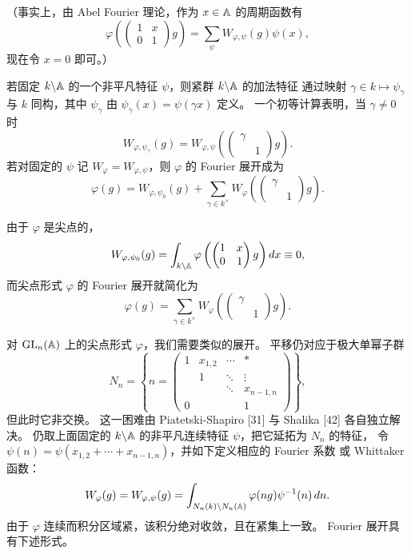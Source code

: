 （事实上，由 Abel Fourier 理论，作为 $x\in\mathbb{A}$ 的周期函数有
\[
\varphi\left(\begin{pmatrix}1&x\\0&1\end{pmatrix}g\right)=\sum_{\psi}W_{\varphi,\psi}(g)\psi(x),
\]
现在令 $x=0$ 即可。）

若固定 $k\backslash\mathbb{A}$ 的一个非平凡特征 $\psi$，则紧群 $k\backslash\mathbb{A}$ 的加法特征
通过映射 $\gamma\in k\mapsto\psi_\gamma$ 与 $k$ 同构，其中 $\psi_\gamma$ 由
$\psi_\gamma(x)=\psi(\gamma x)$ 定义。
一个初等计算表明，当 $\gamma\neq0$ 时
\[
W_{\varphi,\psi_\gamma}(g)=W_{\varphi,\psi}\left(\begin{pmatrix}\gamma&\\&1\end{pmatrix}g\right).
\]
若对固定的 $\psi$ 记 $W_\varphi=W_{\varphi,\psi}$，则 $\varphi$ 的 Fourier 展开成为
\[
\varphi(g)=W_{\varphi,\psi_0}(g)+\sum_{\gamma\in k^\times}W_\varphi\left(\begin{pmatrix}\gamma&\\&1\end{pmatrix}g\right).
\]

由于 $\varphi$ 是尖点的，
\[
W_{\varphi,\psi_0}(g)=\int_{k\backslash\mathbb{A}}\varphi\left(\begin{pmatrix}1&x\\0&1\end{pmatrix}g\right)dx\equiv0,
\]
而尖点形式 $\varphi$ 的 Fourier 展开就简化为
\[
\varphi(g)=\sum_{\gamma\in k^\times}W_\varphi\left(\begin{pmatrix}\gamma&\\&1\end{pmatrix}g\right).
\]

对 $\mathrm{GL}_n(\mathbb{A})$ 上的尖点形式 $\varphi$，我们需要类似的展开。
平移仍对应于极大单幂子群
\[
N_n=\left\{n=\begin{pmatrix}
1&x_{1,2}&\cdots&*\\
&1&\ddots&\vdots\\
&&\ddots&x_{n-1,n}\\
0&&&1
\end{pmatrix}\right\},
\]
但此时它非交换。
这一困难由 Piatetski-Shapiro [31] 与 Shalika [42] 各自独立解决。
仍取上面固定的 $k\backslash\mathbb{A}$ 的非平凡连续特征 $\psi$，把它延拓为 $N_n$ 的特征，
令 $\psi(n)=\psi(x_{1,2}+\cdots+x_{n-1,n})$，并如下定义相应的 Fourier 系数
或 Whittaker 函数：
\[
W_\varphi(g)=W_{\varphi,\psi}(g)=\int_{N_n(k)\backslash N_n(\mathbb{A})}\varphi(ng)\psi^{-1}(n)\,dn.
\]
由于 $\varphi$ 连续而积分区域紧，该积分绝对收敛，且在紧集上一致。
Fourier 展开具有下述形式。

